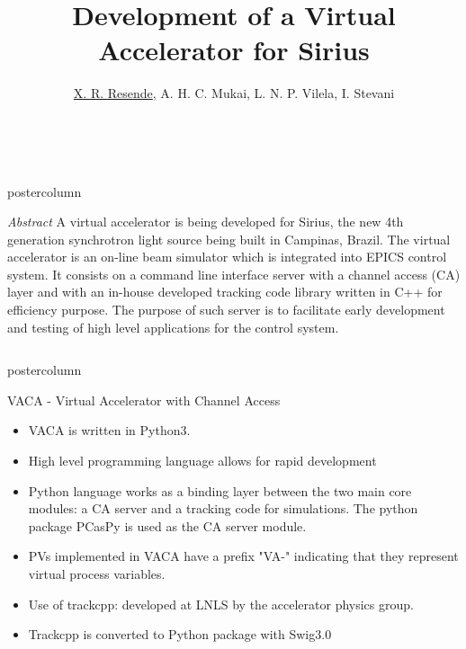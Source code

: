 \documentclass[20pt]{beamer}
\title{\huge Development of a Virtual Accelerator for Sirius}
\author{\underline{X. R. Resende}, A. H. C. Mukai, L. N. P. Vilela, I. Stevani}
\institute{Brazilian Synchrotron Light Laboratory (LNLS), Campinas, Brazil}
\date{\monthname \ \the\year}
\newlength{\abstractheight}
\newlength{\columnheight}
\begin{document}
\begin{frame}
\begin{beamercolorbox}[center]{postercolumn}
	\begin{minipage}{\textwidth}
		\parbox[t][\abstractheight]{\textwidth}{
		\begin{myblock}{\textit{Abstract}}
		A virtual accelerator is being developed for Sirius, the new 4th generation synchrotron light source being built in Campinas, Brazil.
		The virtual accelerator is an on-line beam simulator which is integrated into EPICS control system.
		It consists on a command line interface server with a channel access (CA) layer and with an in-house developed tracking code library written in C++ for efficiency purpose.
		The purpose of such server is to facilitate early development and testing of high level applications for the control system.
		\end{myblock}
	}\end{minipage}
\end{beamercolorbox}
\begin{columns}
	\begin{column}{0.45\textwidth}
		\begin{beamercolorbox}[center]{postercolumn}
			\begin{minipage}{.98\textwidth}  %
				\parbox[t][\columnheight]{\textwidth}{ %
					\begin{myblock}{VACA - Virtual Accelerator with Channel Access}
						\begin{itemize}
							\item VACA is written in Python3.
							\item High level programming language allows for rapid development
							\item Python language works as a binding layer between the two main core modules: a CA server and a tracking code for simulations.
							The python package PCasPy is used as the CA server module.
							\item PVs implemented in VACA have a prefix "VA-" indicating that they represent virtual process variables.
							\item Use of trackcpp: developed at LNLS by the accelerator physics group.
							\item Trackcpp is converted to Python package with Swig3.0
						\end{itemize}
						\begin{figure}

\end{figure}
\end{myblock}}
\end{minipage}
\end{beamercolorbox}
\end{column}
\end{columns}
\end{frame}
\end{document}
